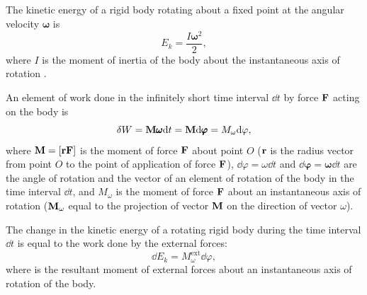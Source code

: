 \subsection{}\label{4.3.3} The kinetic energy of a rigid body rotating about a fixed point at the angular velocity $\pmb{\omega}$ is 
\begin{equation*}%
E_{k} = \frac{I \pmb{\omega}^{2}}{2},
\end{equation*}
where $I$ is the moment of inertia of the body about the instan­taneous axis of rotation .

An element of work done in the infinitely short time interval $\dd t$ by force $\vb{F}$ acting on the body is
\begin{equation*}%
\delta W = \vb{M} \pmb{\omega} \dd t = \vb{M} \dd \pmb{\varphi}  = M_{\omega} \dd \varphi,
\end{equation*}
where $\vb{M} = [\vb{rF}]$ is the moment of force $\vb{F}$ about point $O$ ($\vb{r}$ is the radius vector from point $O$ to the point of application of force $\vb{F}$), $\dd \varphi  = \omega \dd t$ and $\dd \pmb{\varphi} = \pmb{\omega} \dd t$ are the angle of rotation and the vector of an element of rotation of the body in the time interval $\dd t$, and $M_{\omega}$ is the moment of force $\vb{F}$ about an instantaneous axis of rotation ($\vb{M}_{\omega}$ equal to the projection of vector $\vb{M}$ on the direction of vector $\omega$).

The change in the kinetic energy of a rotating rigid body during the time interval $\dd t$ is equal to the work done by the external forces:
\begin{equation*}%
\dd E_{k} = M^{\textrm{ext}}_{\omega} \dd \varphi,
\end{equation*}
where is the resultant moment  of external forces about an instantaneous axis of rotation of the body.

